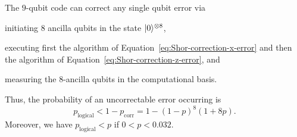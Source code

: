 \documentclass[a4paper, oneside, 12pt]{amsart}
\begin{document}
\begin{proposition}\label{prop:shor-can-correct-any-error}
  The \(9\)-qubit code can correct any single qubit error via
  \begin{thmlist}
    \item initiating \(8\) ancilla qubits in the state \(\lvert0\rangle^{\otimes 8}\),
    \item executing first the algorithm of Equation~\eqref{eq:Shor-correction-x-error} and then the algorithm of Equation~\eqref{eq:Shor-correction-z-error}, and
    \item measuring the \(8\)-ancilla qubits in the computational basis.
  \end{thmlist}
  Thus, the probability of an uncorrectable error occurring is
  \begin{equation}
    p_{\mathrm{logical}} < 1 - p_{\mathrm{corr}} = 1 - (1-p)^{8}(1+ 8p).
  \end{equation}
  Moreover, we have \(p_{\mathrm{logical}}<p\) if \(0<p<0.032\).
\end{proposition}
\end{document}
